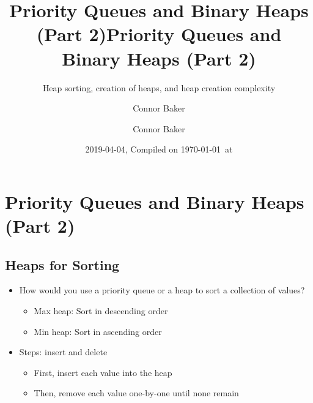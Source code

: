 \documentclass[
  10pt,
  english,
  letterpaper,
,tablecaptionabove
]{scrartcl}
\title{Priority Queues and Binary Heaps (Part 2)}
\subtitle{Heap sorting, creation of heaps, and heap creation complexity}
\author{Connor Baker}
\date{2019-04-04, Compiled on \today~at \currenttime}
\title{Priority Queues and Binary Heaps (Part 2)}
\author{Connor Baker}
\providecommand{\tightlist}{%
  \setlength{\itemsep}{0pt}\setlength{\parskip}{0pt}}
\begin{document}

\begin{titlepage}
\afterpage{\restorepagecolor}
\newcommand{\colorRule}[3][black]{\textcolor[HTML]{#1}{\rule{#2}{#3}}}
\end{titlepage}
\restoregeometry




\hypertarget{priority-queues-and-binary-heaps-part-2}{%
\section{Priority Queues and Binary Heaps (Part
2)}\label{priority-queues-and-binary-heaps-part-2}}

\hypertarget{heaps-for-sorting}{%
\subsection{Heaps for Sorting}\label{heaps-for-sorting}}

\begin{itemize}
\tightlist
\item
  How would you use a priority queue or a heap to sort a collection of
  values?

  \begin{itemize}
  \tightlist
  \item
    Max heap: Sort in descending order
  \item
    Min heap: Sort in ascending order
  \end{itemize}
\item
  Steps: insert and delete

  \begin{itemize}
  \tightlist
  \item
    First, insert each value into the heap
  \item
    Then, remove each value one-by-one until none remain
  \end{itemize}
\end{itemize}
\end{document}

